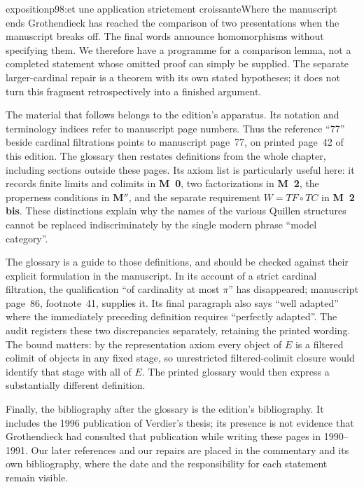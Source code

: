 \begin{dcomment}{exposition}{p98:et une application strictement croissante}{Where the manuscript ends}
Grothendieck has reached the comparison of two presentations when the manuscript breaks off. The final words announce homomorphisms without specifying them. We therefore have a programme for a comparison lemma, not a completed statement whose omitted proof can simply be supplied. The separate larger-cardinal repair is a theorem with its own stated hypotheses; it does not turn this fragment retrospectively into a finished argument.

The material that follows belongs to the edition's apparatus. Its notation and terminology indices refer to manuscript page numbers. Thus the reference ``77'' beside cardinal filtrations points to manuscript page~77, on printed page~42 of this edition. The glossary then restates definitions from the whole chapter, including sections outside these pages. Its axiom list is particularly useful here: it records finite limits and colimits in \textbf{M~0}, two factorizations in \textbf{M~2}, the properness conditions in $\mathbf M''$, and the separate requirement $W=TF\circ TC$ in \textbf{M~2\,bis}. These distinctions explain why the names of the various Quillen structures cannot be replaced indiscriminately by the single modern phrase ``model category''.

The glossary is a guide to those definitions, and should be checked against their explicit formulation in the manuscript. In its account of a strict cardinal filtration, the qualification ``of cardinality at most $\pi$'' has disappeared; manuscript page~86, footnote~41, supplies it. Its final paragraph also says ``well adapted'' where the immediately preceding definition requires ``perfectly adapted''. The audit registers these two discrepancies separately, retaining the printed wording. The bound matters: by the representation axiom every object of $E$ is a filtered colimit of objects in any fixed stage, so unrestricted filtered-colimit closure would identify that stage with all of $E$. The printed glossary would then express a substantially different definition.

Finally, the bibliography after the glossary is the edition's bibliography. It includes the 1996 publication of Verdier's thesis; its presence is not evidence that Grothendieck had consulted that publication while writing these pages in 1990--1991. Our later references and our repairs are placed in the commentary and its own bibliography, where the date and the responsibility for each statement remain visible.
\end{dcomment}


